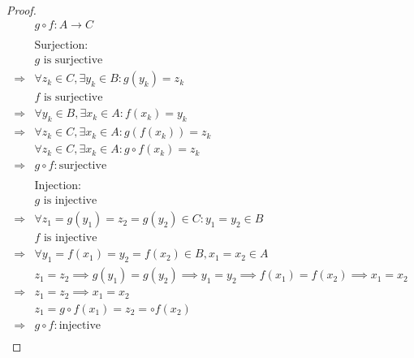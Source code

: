 \documentclass{article}
\begin{document}
~

\begin{proof}
    \begin{align*}
        &g\circ f:A\rightarrow C\\
        &\\
        &\text{Surjection}:\\
        &g\text{ is surjective}\\
        \Rightarrow&\forall z_k\in C,\exists y_k\in B:g(y_k)=z_k\\
        &f\text{ is surjective}\\
        \Rightarrow&\forall y_k\in B,\exists x_k\in A:f(x_k)=y_k\\
        \Rightarrow&\forall z_k\in C,\exists x_k\in A:g(f(x_k))=z_k\\
        &\forall z_k\in C,\exists x_k\in A:g\circ f(x_k)=z_k\\
        \Rightarrow&g\circ f:\text{surjective}\\
        &\\
        &\text{Injection}:\\
        &g\text{ is injective}\\
        \Rightarrow&\forall z_1=g(y_1)=z_2=g(y_2)\in C:y_1=y_2\in B\\
        &f\text{ is injective}\\
        \Rightarrow&\forall y_1=f(x_1)=y_2=f(x_2)\in B,x_1=x_2\in A\\
        &z_1=z_2\implies g(y_1)=g(y_2)\implies y_1=y_2\implies f(x_1)=f(x_2)\implies x_1=x_2\\
        \Rightarrow&z_1=z_2\implies x_1=x_2\\
        &z_1=g\circ f(x_1)=z_2=\circ f(x_2)\\
        \Rightarrow&g\circ f:\text{injective}\\
    \end{align*}
\end{proof}
\end{document}
